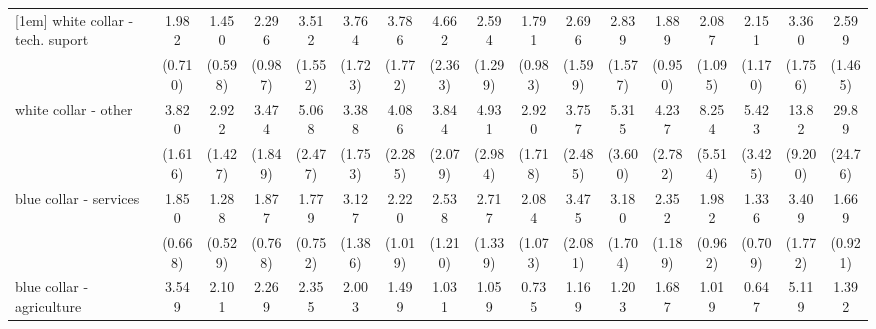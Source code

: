 {\begin{tabular}{l*{16}{c}}
[1em]
white collar - tech. suport&       1.982         &       1.450         &       2.296         &       3.512\sym{**} &       3.764\sym{**} &       3.786\sym{**} &       4.662\sym{**} &       2.594         &       1.791         &       2.696         &       2.839         &       1.889         &       2.087         &       2.151         &       3.360\sym{*}  &       2.599         \\
                    &     (0.710)         &     (0.598)         &     (0.987)         &     (1.552)         &     (1.723)         &     (1.772)         &     (2.363)         &     (1.299)         &     (0.983)         &     (1.599)         &     (1.577)         &     (0.950)         &     (1.095)         &     (1.170)         &     (1.756)         &     (1.465)         \\
[1em]
white collar - other&       3.820\sym{**} &       2.922\sym{*}  &       3.474\sym{*}  &       5.068\sym{***}&       3.388\sym{*}  &       4.086\sym{*}  &       3.844\sym{*}  &       4.931\sym{**} &       2.920         &       3.757\sym{*}  &       5.315\sym{*}  &       4.237\sym{*}  &       8.254\sym{**} &       5.423\sym{**} &       13.82\sym{***}&       29.89\sym{***}\\
                    &     (1.616)         &     (1.427)         &     (1.849)         &     (2.477)         &     (1.753)         &     (2.285)         &     (2.079)         &     (2.984)         &     (1.718)         &     (2.485)         &     (3.600)         &     (2.782)         &     (5.514)         &     (3.425)         &     (9.200)         &     (24.76)         \\
[1em]
blue collar - services&       1.850         &       1.288         &       1.877         &       1.779         &       3.127\sym{*}  &       2.220         &       2.538         &       2.717\sym{*}  &       2.084         &       3.475\sym{*}  &       3.180\sym{*}  &       2.352         &       1.982         &       1.336         &       3.409\sym{*}  &       1.669         \\
                    &     (0.668)         &     (0.529)         &     (0.768)         &     (0.752)         &     (1.386)         &     (1.019)         &     (1.210)         &     (1.339)         &     (1.073)         &     (2.081)         &     (1.704)         &     (1.189)         &     (0.962)         &     (0.709)         &     (1.772)         &     (0.921)         \\
[1em]
blue collar - agriculture&       3.549\sym{*}  &       2.101         &       2.269         &       2.355         &       2.003         &       1.499         &       1.031         &       1.059         &       0.735         &       1.169         &       1.203         &       1.687         &       1.019         &       0.647         &       5.119\sym{*}  &       1.392         \\

\end{tabular}}
